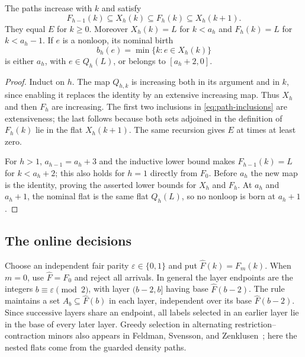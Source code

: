 \begin{lemma}\label{lem:paths}
The paths increase with $k$ and satisfy
\begin{equation}\label{eq:path-inclusions}
 F_{h-1}(k)\subseteq X_h(k)\subseteq F_h(k)\subseteq X_h(k+1).
\end{equation}
They equal $E$ for $k\ge0$. Moreover $X_h(k)=L$ for $k<a_h$ and
$F_h(k)=L$ for $k<a_h-1$. If $e$ is a nonloop, its nominal birth
\[
 b_h(e)=\min\{k:e\in X_h(k)\}
\]
is either $a_h$, with $e\in Q_h(L)$, or belongs to $[a_h+2,0]$.
\end{lemma}
\begin{proof}
Induct on $h$. The map $Q_{h,k}$ is increasing both in its argument and
in $k$, since enabling it replaces the identity by an extensive increasing
map. Thus $X_h$ and then $F_h$ are increasing. The first two inclusions
in \eqref{eq:path-inclusions} are extensiveness; the last follows because
both sets adjoined in the definition of $F_h(k)$ lie in the flat $X_h(k+1)$.
The same recursion gives $E$ at times at least zero.

For $h>1$, $a_{h-1}=a_h+3$ and the inductive lower bound makes
$F_{h-1}(k)=L$ for $k<a_h+2$; this also holds for $h=1$ directly from
$F_0$. Before $a_h$ the new map is the identity, proving the asserted
lower bounds for $X_h$ and $F_h$. At $a_h$ and $a_h+1$, the nominal flat
is the same flat $Q_h(L)$, so no nonloop is born at $a_h+1$.
\end{proof}

\subsection{The online decisions}

Choose an independent fair parity $\varepsilon\in\{0,1\}$ and put
$\widehat F(k)=F_m(k)$. When $m=0$, use $\widehat F=F_0$ and reject all
arrivals. In general the layer endpoints are the integers
$b\equiv\varepsilon\pmod2$, with layer $(b-2,b]$ having base
$\widehat F(b-2)$.
The rule maintains a set $A_b\subseteq\widehat F(b)$ in each layer,
independent over its base $\widehat F(b-2)$.
Since successive layers share an endpoint, all labels selected in an
earlier layer lie in the base of every later layer. Greedy selection in
alternating restriction--contraction minors also appears in
Feldman, Svensson, and Zenklusen~\cite[Section 3]{FSZ15}; here the nested
flats come from the guarded density paths.

